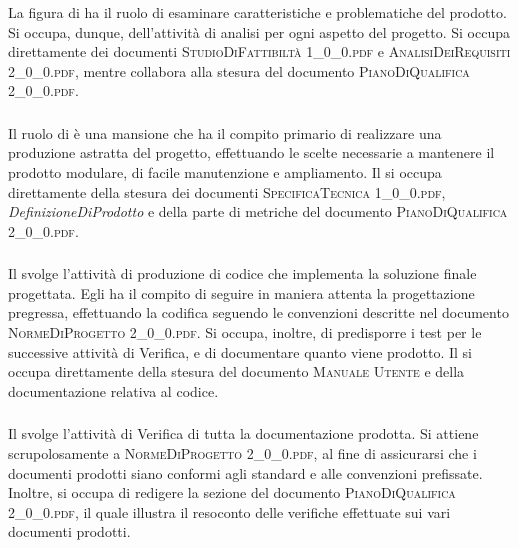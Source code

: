 		\subsubsection{\Ana}
		La figura di \textit{\Ana} ha il ruolo di esaminare caratteristiche e problematiche del prodotto. Si occupa, dunque, dell'attività di analisi per ogni aspetto del progetto. Si occupa direttamente dei documenti \textsc{StudioDiFattibiltà 1\_0\_0.pdf} e \textsc{AnalisiDeiRequisiti 2\_0\_0.pdf}, mentre collabora alla stesura del documento \textsc{PianoDiQualifica 2\_0\_0.pdf}.

		\subsubsection{\Prog}
		Il ruolo di \textit{\Prog} è una mansione che ha il compito primario di realizzare una produzione astratta del progetto, effettuando le scelte necessarie a mantenere il prodotto modulare, di facile manutenzione e ampliamento. Il \textit{\Prog} si occupa direttamente della stesura dei documenti \textsc{SpecificaTecnica 1\_0\_0.pdf}, \textit{DefinizioneDiProdotto} e della parte di metriche del documento \textsc{PianoDiQualifica 2\_0\_0.pdf}.
		
		\subsubsection{\Progr}
		Il \textit{\Progr} svolge l'attività di produzione di codice che implementa la soluzione finale progettata. Egli ha il compito di seguire in maniera attenta la progettazione pregressa, effettuando la codifica seguendo le convenzioni descritte nel documento \textsc{NormeDiProgetto 2\_0\_0.pdf}. Si occupa, inoltre, di predisporre i test per le successive attività di Verifica, e di documentare quanto viene prodotto.
		Il \textit{\Progr} si occupa direttamente della stesura del documento \textsc{Manuale Utente} e della documentazione relativa al codice.
		
		\subsubsection{\Ver}
		Il \textit{\Ver} svolge l'attività di Verifica di tutta la documentazione prodotta. Si attiene scrupolosamente a \textsc{NormeDiProgetto 2\_0\_0.pdf}, al fine di assicurarsi che i documenti prodotti siano conformi agli standard e alle convenzioni prefissate. Inoltre, si occupa di redigere la sezione del documento \textsc{PianoDiQualifica 2\_0\_0.pdf}, il quale illustra il resoconto delle verifiche effettuate sui vari documenti prodotti.

